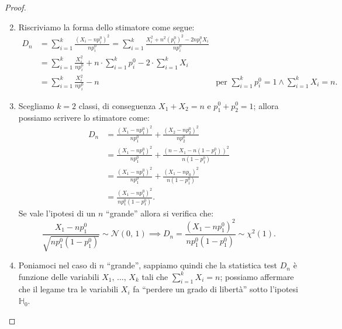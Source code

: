         \begin{proof}
            \hfill
            \begin{enumerate}
                \setcounter{enumi}{1}
                \item Riscriviamo la forma dello stimatore come segue:
                    \begin{align*}
                        D_{n} &= \sum_{i=1}^{k} \frac{(X_i - np_i^0)^2}{np^0_i} =
                            \sum_{i=1}^{k} \frac{X_i^2 +n^2(p_i^0)^2 -2np_i^0 X_i}{np_i^0} \\
                        &= \sum_{i=1}^{k} \frac{X_i^2}{np_i^0} + n\cdot \sum_{i=1}^{k} p_i^0 - 
                              2\cdot \sum_{i=1}^{k} X_i \\
                        &= \sum_{i=1}^{k} \frac{X_i^2}{np_i^0} - n & \text{per }
                            \sum_{i=1}^{k} p_i^0 = 1 \land \sum_{i=1}^{k} X_i = n
                        .\end{align*}
                \item Scegliamo $k=2$ classi, di conseguenza $X_1+X_2 = n$ e $p_1^0 + p_2^0 = 1$; 
                    allora possiamo scrivere lo stimatore come:
                    \begin{align*}
                        D_n &= \frac{(X_1 -np_1^0)^2}{np_1^0} + \frac{(X_2 -np_2^0)^2}{np_2^0} \\
                            &= \frac{(X_1 -np_1^0)^2}{np_1^0} + \frac{(n-X_1-n(1-p_1^0))^2}{n(1-p_1^0)} \\
                            &= \frac{(X_1 -np_1^0)^2}{np_1^0} + \frac{(X_1-np_0)^2}{n(1-p_1^0)} \\
                            &= \frac{(X_1 -np_1^0)^2}{np_1^0(1-p_1^0)}
                    .\end{align*}
                    Se vale l'ipotesi di un $n$ ``grande'' allora si verifica che:
                    \begin{equation*}
                        \frac{X_1-np_1^0}{\sqrt{np_1^0(1-p_1^0)}} \sim \mathcal{N}(0,\,1) \implies 
                        D_n = \frac{(X_1 -np_1^0)^2}{np_1^0(1-p_1^0)} \sim \chi^2(1)
                    .\end{equation*}
                \item Poniamoci nel caso di $n$ ``grande'', sappiamo quindi che la statistica test $D_n$ è 
                    funzione delle variabili $X_1,\, \ldots,\, X_{k}$ tali che $\sum_{i=1}^{k} X_i = n$; 
                    possiamo affermare che il legame tra le variabili $X_i$ fa ``perdere un grado di libertà'' 
                    sotto l'ipotesi $\mathbb{H}_0$. \qedhere
            \end{enumerate}
        \end{proof}
